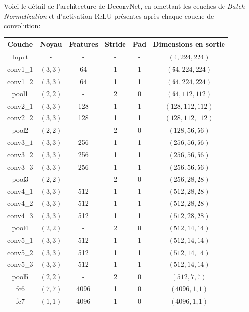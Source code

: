 \documentclass[a4paper, 11pt]{report}
\begin{document}
Voici le détail de l'architecture de DeconvNet, en omettant les couches de \emph{Batch Normalization} \citep{Ioffe2015} et d'activation ReLU \citep{Glorot2011} présentes après chaque couche de convolution:
\begin{table}[H]
	\centering
	\begin{tabular}{|c|c|c|c|c|c|}
	\hline 
	Couche & Noyau & Features & Stride & Pad & Dimensions en sortie \\ 
	\hline 
	Input & - & - & - & - & $(4, 224, 224)$\\ 
	\hline 
	conv1\_$1$ & $(3, 3)$ & 64 & 1 & 1 & $(64, 224, 224)$ \\
	\hline 
	conv1\_$2$ & $(3, 3)$ & 64 & 1 & 1 & $(64, 224, 224)$ \\
	\hline 
	pool1 & $(2, 2)$ & - & 2 & 0 & $(64, 112, 112)$ \\
	\hline 
	conv2\_$1$ & $(3, 3)$ & 128 & 1 & 1 & $(128, 112, 112)$ \\
	\hline 
	conv2\_$2$ & $(3, 3)$ & 128 & 1 & 1 & $(128, 112, 112)$ \\
	\hline 
	pool2 & $(2, 2)$ & - & 2 & 0 & $(128, 56, 56)$ \\
	\hline 
	conv3\_$1$ & $(3, 3)$ & 256 & 1 & 1 & $(256, 56, 56)$ \\
	\hline 
	conv3\_$2$ & $(3, 3)$ & 256 & 1 & 1 & $(256, 56, 56)$ \\
	\hline 
	conv3\_$3$ & $(3, 3)$ & 256 & 1 & 1 & $(256, 56, 56)$ \\
	\hline 
	pool3 & $(2, 2)$ & - & 2 & 0 & $(256, 28, 28)$ \\
	\hline 
	conv4\_$1$ & $(3, 3)$ & 512 & 1 & 1 & $(512, 28, 28)$ \\
	\hline 
	conv4\_$2$ & $(3, 3)$ & 512 & 1 & 1 & $(512, 28, 28)$ \\
	\hline 
	conv4\_$3$ & $(3, 3)$ & 512 & 1 & 1 & $(512, 28, 28)$ \\
	\hline 
	pool4 & $(2, 2)$ & - & 2 & 0 & $(512, 14, 14)$ \\
	\hline 
	conv5\_$1$ & $(3, 3)$ & 512 & 1 & 1 & $(512, 14, 14)$ \\
	\hline
	conv5\_$2$ & $(3, 3)$ & 512 & 1 & 1 & $(512, 14, 14)$ \\
	\hline
	conv5\_$3$ & $(3, 3)$ & 512 & 1 & 1 & $(512, 14, 14)$ \\
	\hline
	pool5 & $(2, 2)$ & - & 2 & 0 & $(512, 7, 7)$ \\
	\hline
	fc6 & $(7, 7)$ & 4096 & 1 & 0 & $(4096, 1, 1)$ \\
	\hline
	fc7 & $(1, 1)$ & 4096 & 1 & 0 & $(4096, 1, 1)$ \\

\end{tabular}
\end{table}
\end{document}
